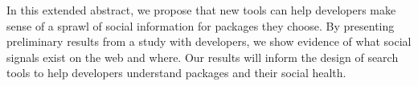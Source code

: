 In this extended abstract, we propose that new tools can help developers make sense of a sprawl of social information for packages they choose.
By presenting preliminary results from a study with developers, we show evidence of what social signals exist on the web and where.
Our results will inform the design of search tools to help developers understand packages and their social health.
